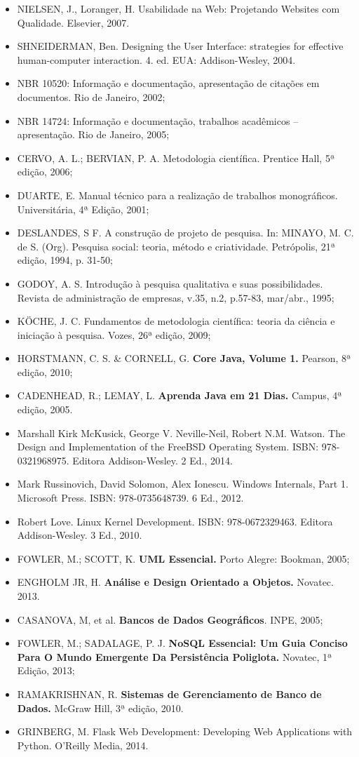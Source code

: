 \begin{itemize}
	\item NIELSEN, J., Loranger, H. Usabilidade na Web: Projetando Websites com Qualidade. Elsevier, 2007.
	\item SHNEIDERMAN, Ben. Designing the User Interface: strategies for effective human-computer interaction. 4. ed. EUA: Addison-Wesley, 2004.
    \item NBR 10520: Informação e documentação, apresentação de citações em documentos. Rio de Janeiro, 2002;
    \item NBR 14724: Informação e documentação, trabalhos acadêmicos – apresentação. Rio de Janeiro, 2005;
    \item CERVO, A. L.; BERVIAN, P. A. Metodologia científica.  Prentice Hall, 5ª edição, 2006;
    \item DUARTE, E. Manual técnico para a realização de trabalhos monográficos.  Universitária, 4ª Edição, 2001;
    \item DESLANDES, S F. A construção de projeto de pesquisa. In: MINAYO, M. C. de S. (Org). Pesquisa social: teoria, método e criatividade.  Petrópolis, 21ª edição, 1994, p. 31-50; 
    \item GODOY, A. S. Introdução à pesquisa qualitativa e suas possibilidades. Revista de administração de empresas, v.35, n.2, p.57-83, mar/abr., 1995;
    \item KÖCHE, J. C. Fundamentos de metodologia científica: teoria da ciência e iniciação à pesquisa. Vozes, 26ª edição, 2009;
	\item HORSTMANN, C. S. \& CORNELL, G. \textbf{Core Java, Volume 1.} Pearson, 8ª edição, 2010;
	\item CADENHEAD, R.; LEMAY, L. \textbf{Aprenda Java em 21 Dias.} Campus, 4ª edição, 2005.
	\item Marshall Kirk McKusick, George V. Neville-Neil, Robert N.M. Watson. The Design and Implementation of the FreeBSD Operating System. ISBN: 978-0321968975. Editora Addison-Wesley. 2 Ed., 2014.
	\item Mark Russinovich, David Solomon, Alex Ionescu. Windows Internals, Part 1. Microsoft Press. ISBN: 978-0735648739. 6 Ed., 2012.
	\item Robert Love. Linux Kernel Development. ISBN: 978-0672329463. Editora Addison-Wesley. 3 Ed., 2010.
  	\item FOWLER, M.; SCOTT, K. \textbf{UML Essencial.} Porto Alegre: Bookman, 2005;
	\item ENGHOLM JR, H. \textbf{Análise e Design Orientado a Objetos.} Novatec. 2013.
	\item 	CASANOVA, M, et al. \textbf{Bancos de Dados Geográficos}. INPE, 2005; 
	\item 	FOWLER, M.; SADALAGE, P. J. \textbf{NoSQL Essencial: Um Guia Conciso Para O Mundo Emergente Da Persistência Poliglota.} Novatec, 1ª Edição, 2013;
	\item 	RAMAKRISHNAN, R. \textbf{Sistemas de Gerenciamento de Banco de Dados.} McGraw Hill, 3ª edição, 2010.
    \item GRINBERG, M.
          Flask Web Development: Developing Web Applications with Python.
          O'Reilly Media, 2014.


\end{itemize}
